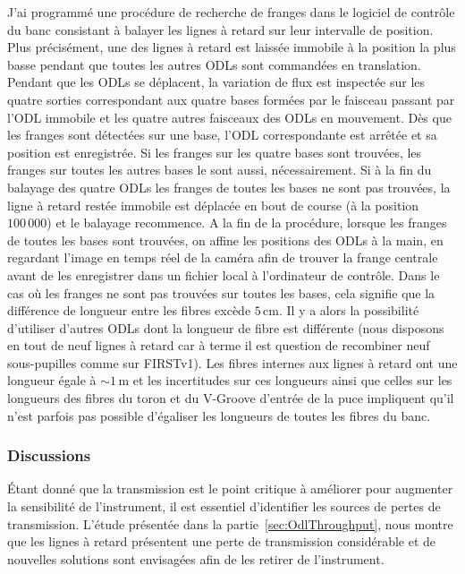J'ai programmé une procédure de recherche de franges dans le logiciel de contrôle du banc consistant à balayer les lignes à retard sur leur intervalle de position. Plus précisément, une des lignes à retard est laissée immobile à la position la plus basse pendant que toutes les autres \ac{ODL}s sont commandées en translation. Pendant que les \ac{ODL}s se déplacent, la variation de flux est inspectée sur les quatre sorties correspondant aux quatre bases formées par le faisceau passant par l'\ac{ODL} immobile et les quatre autres faisceaux des \ac{ODL}s en mouvement. Dès que les franges sont détectées sur une base, l'\ac{ODL} correspondante est arrêtée et sa position est enregistrée. Si les franges sur les quatre bases sont trouvées, les franges sur toutes les autres bases le sont aussi, nécessairement. Si à la fin du balayage des quatre \ac{ODL}s les franges de toutes les bases ne sont pas trouvées, la ligne à retard restée immobile est déplacée en bout de course (à la position $100\,000$) et le balayage recommence. A la fin de la procédure, lorsque les franges de toutes les bases sont trouvées, on affine les positions des \ac{ODL}s à la main, en regardant l'image en temps réel de la caméra afin de trouver la frange centrale avant de les enregistrer dans un fichier local à l'ordinateur de contrôle. Dans le cas où les franges ne sont pas trouvées sur toutes les bases, cela signifie que la différence de longueur entre les fibres excède $5 \,$cm. Il y a alors la possibilité d'utiliser d'autres \ac{ODL}s dont la longueur de fibre est différente (nous disposons en tout de neuf lignes à retard car à terme il est question de recombiner neuf sous-pupilles comme sur \ac{FIRSTv1}). Les fibres internes aux lignes à retard ont une longueur égale à $\sim 1 \,$m et les incertitudes sur ces longueurs ainsi que celles sur les longueurs des fibres du toron et du V-Groove d'entrée de la puce impliquent qu'il n'est parfois pas possible d'égaliser les longueurs de toutes les fibres du banc.


\subsubsection{Discussions}

Étant donné que la transmission est le point critique à améliorer pour augmenter la sensibilité de l'instrument, il est essentiel d'identifier les sources de pertes de transmission. L'étude présentée dans la partie~\ref{sec:OdlThroughput}, nous montre que les lignes à retard présentent une perte de transmission considérable et de nouvelles solutions sont envisagées afin de les retirer de l'instrument.

